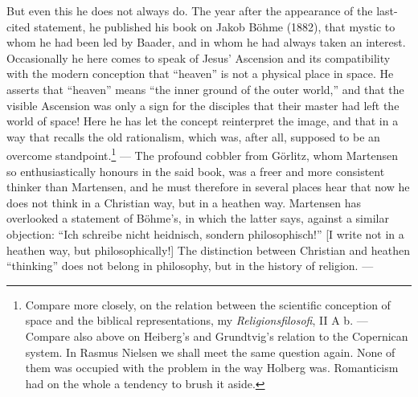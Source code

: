 \documentclass[12pt,a4paper]{book}
\newcommand{\opage}[1]{\marginnote{\footnotesize\textit{[#1]}}}
\begin{document}
But even this he does not always do. The year after the appearance of the last-cited statement, he
published his book on Jakob Böhme (1882), that mystic to whom he had been led by Baader, and in whom
he had always taken an interest. Occasionally he here comes to speak of Jesus' Ascension and its
compatibility with the modern conception that ``heaven'' is not a physical place in space. He
asserts that ``heaven'' means ``the inner ground of the outer world,'' and that the visible
Ascension was only a sign for the disciples that their master had left the world of space! Here he
has let the concept reinterpret the image, and that in a way that recalls the old rationalism, which
was, after all, supposed to be an overcome standpoint.\footnote{Compare more closely, on the
relation between the scientific conception of space and the biblical representations, my
\emph{Religionsfilosofi}, II A b. --- Compare also above on Heiberg's and Grundtvig's relation to
the Copernican system. In Rasmus Nielsen we shall meet the same question again. None of them was
occupied with the problem in the way Holberg was. Romanticism had on the whole a tendency to brush
it aside.} --- The profound cobbler \opage{145}from Görlitz, whom Martensen so enthusiastically honours in the
said book, was a freer and more consistent thinker than Martensen, and he must therefore in several
places hear that now he does not think in a Christian way, but in a heathen way. Martensen has
overlooked a statement of Böhme's, in which the latter says, against a similar objection: ``Ich
schreibe nicht heidnisch, sondern philosophisch!'' [I write not in a heathen way, but
philosophically!] The distinction between Christian and heathen ``thinking'' does not belong in
philosophy, but in the history of religion. ---
\end{document}
